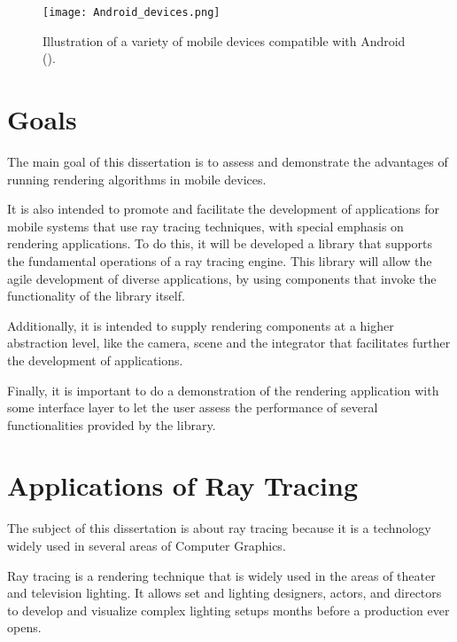 \begin{figure}[H]
	\centering
	\caption{Illustration of a variety of mobile devices compatible with Android (\cite{AndroidDevices}).}
	\label{Illustration of a variety of mobile devices compatible with Android}
	\texttt{[image: Android\_devices.png]}
\end{figure}


\section{Goals}

\par
The main goal of this dissertation is to assess and demonstrate the advantages of running rendering algorithms in mobile devices.

\par
It is also intended to promote and facilitate the development of applications for mobile systems that use ray tracing techniques, with special emphasis on rendering applications.
To do this, it will be developed a library that supports the fundamental operations of a ray tracing engine.
This library will allow the agile development of diverse applications, by using components that invoke the functionality of the library itself.

\par
Additionally, it is intended to supply rendering components at a higher abstraction level, like the camera, scene and the integrator that facilitates further the development of applications.

\par
Finally, it is important to do a demonstration of the rendering application with some interface layer to let the user assess the performance of several functionalities provided by the library.

\section{Applications of Ray Tracing}

\par
The subject of this dissertation is about ray tracing because it is a technology widely used in several areas of Computer Graphics.

\par
Ray tracing is a rendering technique that is widely used in the areas of theater and television lighting.
It allows set and lighting designers, actors, and directors to develop and visualize complex lighting setups months before a production ever opens.

